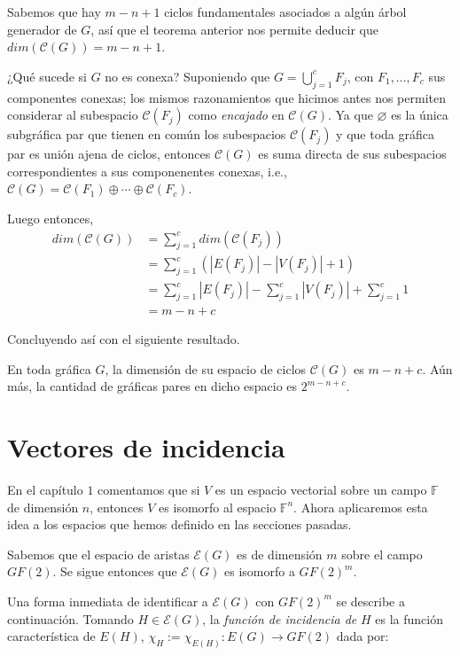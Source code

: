 Sabemos que hay $m -n+1$ ciclos fundamentales asociados a algún árbol generador de $G$, así que el teorema anterior nos permite deducir que $dim(\mathcal{C}(G))=m-n+1$.

¿Qué sucede si $G$ no es conexa? Suponiendo que $G = \bigcup_{j=1}^{c}F_{j}$, con $F_{1}, \ldots, F_{c}$ sus componentes conexas; los mismos razonamientos que hicimos antes nos permiten considerar al subespacio $\mathcal{C}(F_{j})$ como \textit{encajado} en $\mathcal{C}(G)$. Ya que $\varnothing$ es la única subgráfica par que tienen en común los subespacios $\mathcal{C}(F_{j})$ y que toda gráfica par es unión ajena de ciclos, entonces $\mathcal{C}(G)$ es suma directa de sus subespacios correspondientes a sus componenentes conexas, i.e., $\mathcal{C}(G)= \mathcal{C}(F_{1}) \oplus \cdots \oplus \mathcal{C}(F_{c})$.

Luego entonces, 
\begin{align*}
    dim(\mathcal{C}(G)) &= \sum_{j = 1}^{c}dim(\mathcal{C}(F_{j}))\\
    &= \sum_{j = 1}^{c} (|E(F_{j})|-|V(F_{j})| + 1) \\
    &= \sum_{j=1}^{c} |E(F_{j})| - \sum_{j=1}^{c} |V(F_{j})| + \sum_{j=1}^{c} 1\\
    &= m - n + c
\end{align*}

Concluyendo así con el siguiente resultado.

\begin{teo}\label{teo:dimciclos}
En toda gráfica $G$, la dimensión de su espacio de ciclos $\mathcal{C}(G)$ es $m -n +c$. Aún más, la cantidad de gráficas pares en dicho espacio es $2^{m-n+c}$.
\end{teo}


\section{Vectores de incidencia}

En el capítulo $1$ comentamos que si $V$ es un espacio vectorial sobre un campo $\mathbb{F}$ de dimensión $n$, entonces $V$ es isomorfo al espacio $\mathbb{F}^n$. Ahora aplicaremos esta idea a los espacios que hemos definido en las secciones pasadas.

Sabemos que el espacio de aristas $\mathcal{E}(G)$ es de dimensión $m$ sobre el campo $GF(2)$. Se sigue entonces que $\mathcal{E}(G)$ es isomorfo a $GF(2)^m$. 

Una forma inmediata de identificar a $\mathcal{E}(G)$ con $GF(2)^m$ se describe a continuación. Tomando $H \in \mathcal{E}(G)$, la \textit{función de incidencia de} $H$ es la función característica de $E(H)$, $\chi_{H} := \chi_{E(H)} : E(G) \rightarrow GF(2)$ dada por:

